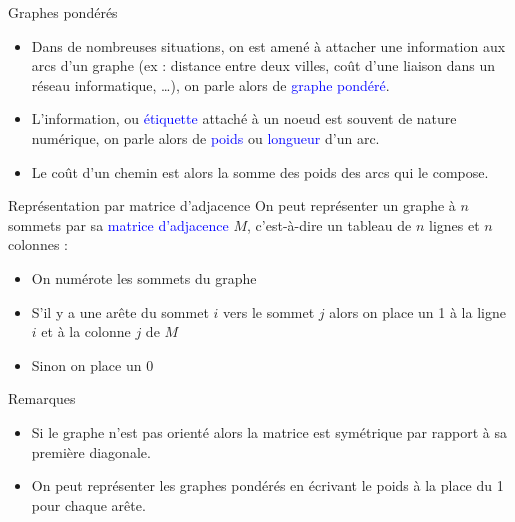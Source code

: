 \documentclass[10pt,french]{beamer}
\begin{document}
\begin{frame}[fragile]{\Ctitle}{\stitle}
	\begin{block}{Graphes pondérés}
		\begin{itemize}
			\item<1-> Dans de nombreuses situations, on est amené à attacher une information aux arcs d'un graphe (ex : distance entre deux villes, coût d'une liaison dans un réseau informatique, \dots), on parle alors de \textcolor{blue}{graphe pondéré}.
			\item<2-> L'information, ou \textcolor{blue}{étiquette} attaché à un noeud est souvent de nature numérique, on parle alors de \textcolor{blue}{poids} ou \textcolor{blue}{longueur} d'un arc.
				\item<3->Le coût d'un chemin est alors la somme des poids des arcs qui le compose.
		\end{itemize}
	\end{block}
\end{frame}

\begin{frame}[fragile]{\Ctitle}{\stitle}
	\begin{alertblock}{Représentation par matrice d'adjacence}
		On peut représenter un graphe à $n$ sommets par sa \textcolor{blue}{matrice d'adjacence} $M$, c'est-à-dire un tableau de $n$ lignes et $n$ colonnes :
		\begin{itemize}
			\item<2-> On numérote les sommets du graphe
			\item<3-> S'il y a une arête du sommet $i$ vers le sommet $j$ alors on place un 1 à la ligne $i$ et à la colonne $j$ de $M$
			\item<4-> Sinon on place un 0
		\end{itemize}
	\end{alertblock}
	\begin{block}{Remarques}
		\begin{itemize}
			\item<5-> Si le graphe n'est pas orienté alors la matrice est symétrique par rapport à sa première diagonale.
			\item<6-> On peut représenter les graphes pondérés en écrivant le poids à la place du 1 pour chaque arête.
		\end{itemize}
	\end{block}
\end{frame}
\end{document}
